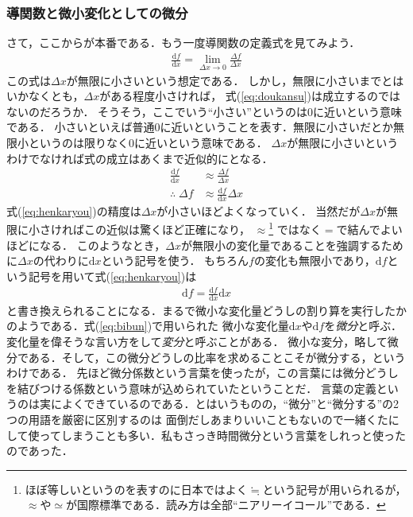 \subsubsection{導関数と微小変化としての微分}
さて，ここからが本番である．もう一度導関数の定義式を見てみよう．
\begin{align}
\frac{\mathrm{d}f}{\mathrm{d}x} = \lim_{\varDelta x \to 0} \frac{\varDelta f}{\varDelta x}
\label{eq:doukansu}
\end{align}
この式は$\varDelta x$が無限に小さいという想定である．
しかし，無限に小さいまでとはいかなくとも，$\varDelta x$がある程度小さければ，
式(\ref{eq:doukansu})は成立するのではないのだろうか．
そうそう，ここでいう``小さい''というのは0に近いという意味である．
小さいといえば普通0に近いということを表す．無限に小さいだとか無限小というのは限りなく0に近いという意味である．
$\varDelta x$が無限に小さいというわけでなければ式の成立はあくまで近似的にとなる．
\begin{align}
\frac{\mathrm{d}f}{\mathrm{d}x} & \approx \frac{\varDelta f}{\varDelta x} \nonumber \\
\therefore \; \varDelta f & \approx \frac{\mathrm{d}f}{\mathrm{d}x} \varDelta x
\label{eq:henkaryou}
\end{align}
式(\ref{eq:henkaryou})の精度は$\varDelta x$が小さいほどよくなっていく．
当然だが$\varDelta x$が無限に小さければこの近似は驚くほど正確になり，
$\approx$\footnote{ほぼ等しいというのを表すのに日本ではよく$\fallingdotseq$という記号が用いられるが，
$\approx$や$\simeq$が国際標準である．読み方は全部``ニアリーイコール''である．}
ではなく$=$で結んでよいほどになる．
このようなとき，$\varDelta x$が無限小の変化量であることを強調するために$\varDelta x$の代わりに$\mathrm{d}x$という記号を使う．
もちろん$f$の変化も無限小であり，$\mathrm{d}f$という記号を用いて式(\ref{eq:henkaryou})は
\begin{align}
\mathrm{d} f = \frac{\mathrm{d}f}{\mathrm{d}x} \mathrm{d}x
\label{eq:bibun}
\end{align}
と書き換えられることになる．まるで微小な変化量どうしの割り算を実行したかのようである．式(\ref{eq:bibun})で用いられた
微小な変化量$\mathrm{d}x$や$\mathrm{d}f$を\emph{微分}と呼ぶ．
変化量を偉そうな言い方をして\emph{変分}と呼ぶことがある．
微小な変分，略して微分である．そして，この微分どうしの比率を求めることこそが微分する，というわけである．
先ほど微分係数という言葉を使ったが，この言葉には微分どうしを結びつける係数という意味が込められていたということだ．
言葉の定義というのは実によくできているのである．とはいうものの，``微分''と``微分する''の2つの用語を厳密に区別するのは
面倒だしあまりいいこともないので一緒くたにして使ってしまうことも多い．私もさっき時間微分という言葉をしれっと使ったのであった．

